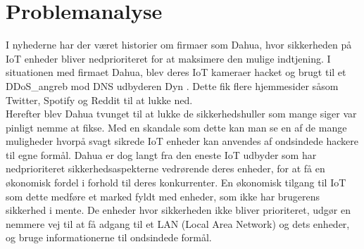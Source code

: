 \section{Problemanalyse}

    I nyhederne har der været historier om firmaer som Dahua, hvor sikkerheden på IoT enheder bliver nedprioriteret for at maksimere den mulige indtjening. I situationen med firmaet Dahua, blev deres IoT kameraer hacket og brugt til et \Gls{DDoS_angreb} mod DNS udbyderen Dyn \autocite{MotherboardVice}. Dette fik flere hjemmesider såsom Twitter, Spotify og Reddit til at lukke ned. \\ 
    Herefter blev Dahua tvunget til at lukke de sikkerhedshuller som mange siger var pinligt nemme at fikse. Med en skandale som dette kan man se en af de mange muligheder hvorpå svagt sikrede IoT enheder kan anvendes af ondsindede hackere til egne formål. Dahua er dog langt fra den eneste IoT udbyder som har nedprioriteret sikkerhedsaspekterne vedrørende deres enheder, for at få en økonomisk fordel i forhold til deres konkurrenter. En økonomisk tilgang til IoT som dette medføre et marked fyldt med enheder, som ikke har brugerens sikkerhed i mente. De enheder hvor sikkerheden ikke bliver prioriteret, udgør en nemmere vej til at få adgang til et LAN (Local Area Network) og dets enheder, og bruge informationerne til ondsindede formål.  
    
